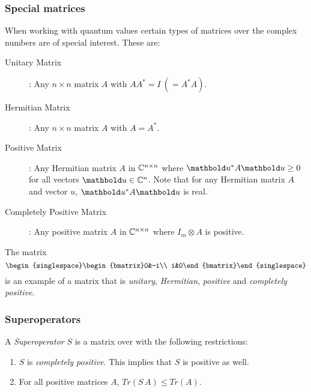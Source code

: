 \subsubsection{Special matrices}
When working with quantum values certain types of matrices over the
complex numbers are of special interest.
These are:
\begin{description}
\item[Unitary Matrix]: Any $n \times n$
matrix $A$ with $A A^{*} = I\ (= A^{*} A)$.
\item[Hermitian Matrix]: Any  $n \times n$ matrix $A$ with $A=A^{*}$.
\item[Positive Matrix]: Any Hermitian matrix $A$ in
$\mathbb{C}^{n\times n}$
where $\vc{u}^{*} A \vc{u} \ge 0$ for all vectors
$\vc{u}\in \complex^n$. Note
that for any Hermitian matrix $A$ and vector $u$,
$\vc{u}^{*} A \vc{u}$ is real.
\item[Completely Positive Matrix]: Any positive matrix $A$ in
$\mathbb{C}^{n\times n}$
where $I_m \otimes A$ is positive.
\end{description}
The matrix
\[{\begin{singlespace}\begin{bmatrix}0&-i\\
i&0\end{bmatrix}\end{singlespace}}\]
is an example of a matrix that is \emph{unitary}, \emph{Hermitian},
\emph{positive} and \emph{completely positive}.

\subsubsection{Superoperators}
A \emph{Superoperator} $S$ is a matrix over \complex{}
with the following restrictions:
\begin{enumerate}
\item{} $S$ is \emph{completely positive}. This implies that
$S$ is positive as well.
\item{} For all positive matrices $A$, $Tr(S\,A) \leq Tr(A)$.
\end{enumerate}
